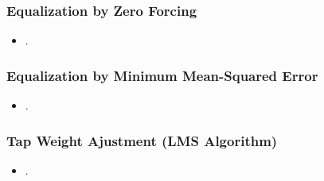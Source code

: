 \documentclass{beamer}
\begin{document}
\begin{frame}
	\frametitle{Equalization by Zero Forcing}
	\begin{itemize}
		\item .
	\end{itemize}
\end{frame}

\begin{frame}
	\frametitle{Equalization by Minimum Mean-Squared Error}
	\begin{itemize}
		\item .
	\end{itemize}
\end{frame}

\begin{frame}
	\frametitle{Tap Weight Ajustment (LMS Algorithm)}
	\begin{itemize}
		\item .
	\end{itemize}
\end{frame}
\end{document}
